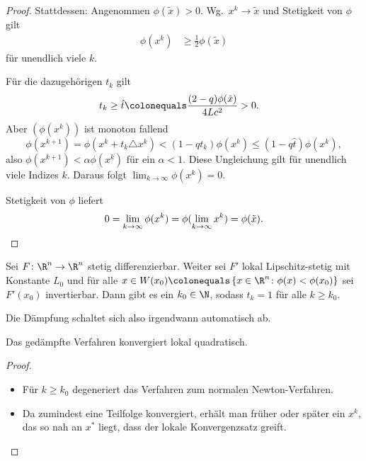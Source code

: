\begin{proof}
\medskip

Stattdessen: Angenommen $\phi (\tilde{x})>0$. Wg.\ $x^k \to \tilde{x}$ und Stetigkeit von $\phi$ gilt
\begin{align*}
 \phi (x^k ) & \geq \frac{1}{2} \phi ( \tilde{x} )
\end{align*}
für unendlich viele $k$.

Für die dazugehörigen $t_k$ gilt
\begin{align*}
 t_k \geq \hat{t} & \colonequals \frac{(2-q) \phi (\tilde{x})}{4Lc^2}>0.
\end{align*}
Aber $(\phi (x^k ) )$ ist monoton fallend
\begin{equation*}
 \phi (x^{k+1})=\phi (x^k+t_k \triangle x^k) <(1-qt_k) \phi (x^k) \leq (1-q \hat{t}) \phi(x^k),
\end{equation*}
also $\phi(x^{k+1}) < \alpha \phi(x^k)$ für ein $\alpha < 1$.
Diese Ungleichung gilt für unendlich viele Indizes $k$. Daraus folgt $\lim_{k \to \infty} \phi (x^k )=0$.

Stetigkeit von $\phi$ liefert
\begin{equation*}
 0 = \lim_{k \to \infty} \phi(x^k) = \phi (\lim_{k \to \infty} x^k )=\phi (\tilde{x}).
 \qedhere
\end{equation*}
\end{proof}

\bigskip

\begin{satz}
\label{thm:nichtlineare_gleichungen:globales_newton_iii}
Sei $F \colon \R^n \to \R^n$ stetig differenzierbar. Weiter sei $F'$ lokal Lipschitz-stetig mit Konstante $L_0$ und für alle $x \in W(x_0)\colonequals\left\lbrace x \in \R^n \colon \phi(x)<\phi(x_0) \right\rbrace$ sei $F'(x_0)$ invertierbar. Dann gibt es ein $k_0 \in \N$, sodass $t_k=1$ für alle $k \geq k_0$.
\end{satz}

Die Dämpfung schaltet sich also irgendwann automatisch ab.

\begin{kor}
Das gedämpfte Verfahren konvergiert lokal quadratisch.
\end{kor}
\begin{proof}
\begin{itemize}
 \item Für $k \ge k_0$ degeneriert das Verfahren zum normalen Newton-Verfahren.

 \item Da zumindest eine Teilfolge konvergiert, erhält man früher oder später ein $x^k$,
  das so nah an $x^*$ liegt, dass der lokale Konvergenzsatz greift.
 \qedhere
\end{itemize}
\end{proof}

